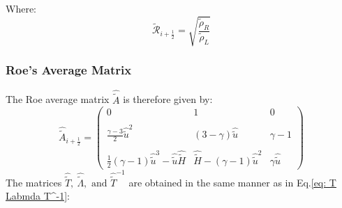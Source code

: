 \documentclass[11pt, a4paper]{article}
\begin{document}
Where:
\begin{equation*}
    \tilde{\mathcal{R}}_{i+\frac{1}{2}}=\sqrt{\displaystyle\frac{\tilde{\rho}_R}{\tilde{\rho}_L}}
\end{equation*}

\subsubsection{Roe's Average Matrix}
The Roe average matrix $\hat{\tilde{A}}$ is therefore given by:
\begin{equation}
    \hat{\tilde{A}}_{i+\frac{1}{2}}=\begin{pmatrix}
        0 & 1 & 0 \\\\
        \displaystyle\frac{\gamma-3}{2}\hat{\tilde{u}}^2 & \left(3-\gamma\right)\hat{\tilde{u}} & \gamma-1 \\\\
        \displaystyle\frac{1}{2}\left(\gamma-1\right)\hat{\tilde{u}}^3-\hat{\tilde{u}}\hat{\tilde{H}} & \hat{\tilde{H}}-\left(\gamma-1\right)\hat{\tilde{u}}^2 & \gamma\hat{\tilde{u}}
    \end{pmatrix}
\end{equation}
The matrices $\hat{\tilde{T}},\ \hat{\tilde{\Lambda}},\text{ and }\hat{\tilde{T}}^{-1}$ are obtained in the same manner as in Eq.\ref{eq: T Labmda T^-1}:
\end{document}
